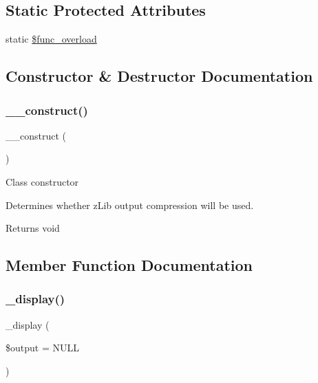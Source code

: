 \subsection*{Static Protected Attributes}
\begin{DoxyCompactItemize}
\item 
static \mbox{\hyperlink{class_c_i___output_aef84be58d58a5895572c5689e56a1047}{\$func\+\_\+overload}}
\end{DoxyCompactItemize}


\subsection{Constructor \& Destructor Documentation}
\mbox{\label{class_c_i___output_a095c5d389db211932136b53f25f39685}} 
\subsubsection{\texorpdfstring{\+\_\+\+\_\+construct()}{\_\_construct()}}
{\footnotesize\ttfamily \+\_\+\+\_\+construct (\begin{DoxyParamCaption}{ }\end{DoxyParamCaption})}

Class constructor

Determines whether z\+Lib output compression will be used.

\begin{DoxyReturn}{Returns}
void 
\end{DoxyReturn}


\subsection{Member Function Documentation}
\mbox{\label{class_c_i___output_a171d6c5d4dfdc425cf9b9fe240ccbafe}} 
\subsubsection{\texorpdfstring{\+\_\+display()}{\_display()}}
{\footnotesize\ttfamily \+\_\+display (\begin{DoxyParamCaption}\item[{}]{\$output = {\ttfamily NULL} }\end{DoxyParamCaption})}

